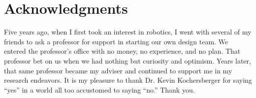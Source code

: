 \chapter*{Acknowledgments}

Five years ago, when I first took an interest in robotics, I went with several of my friends to ask a professor for support in starting our own design team. We entered the professor's office with no money, no experience, and no plan. That professor bet on us when we had nothing but curiosity and optimism. Years later, that same professor became my adviser and continued to support me in my research endeavors. It is my pleasure to thank Dr. Kevin Kochersberger for saying ``yes'' in a world all too accustomed to saying ``no.'' Thank you.
